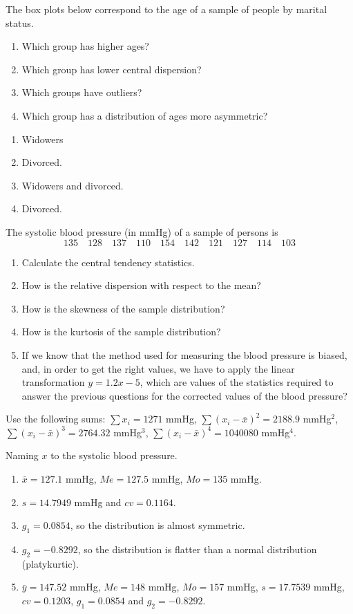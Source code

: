 {The box plots below correspond to the age of a sample of people by marital status.
\begin{center}
\resizebox{0.6\textwidth}{!}{}
\end{center}

\begin{enumerate}
\item Which group has higher ages?
\item Which group has lower central dispersion?
\item Which groups have outliers?
\item Which group has a distribution of ages more asymmetric?
\end{enumerate}
}
{
\begin{enumerate}
\item Widowers
\item Divorced.
\item Widowers and divorced.
\item Divorced.
\end{enumerate}
}
{
}


{The systolic blood pressure (in mmHg) of a sample of persons is
\[
135\quad 128\quad 137\quad 110\quad 154\quad 142\quad 121\quad 127\quad 114\quad 103
\]

\begin{enumerate}
\item Calculate the central tendency statistics.
\item How is the relative dispersion with respect to the mean?
\item How is the skewness of the sample distribution?
\item How is the kurtosis of the sample distribution?
\item If we know that the method used for measuring the blood pressure is biased, and, in order to get the right values,
we have to apply the linear transformation $y=1.2x-5$, which are values of the statistics required to answer the
previous questions for the corrected values of the blood pressure?
\end{enumerate}


Use the following sums: $\sum x_i= 1271$ mmHg, $\sum (x_i-\bar x)^2=2188.9$ mmHg$^2$, $\sum (x_i-\bar x)^3=2764.32$
mmHg$^3$, $\sum (x_i-\bar x)^4=1040080$ mmHg$^4$.
}
{
Naming $x$ to the systolic blood pressure.
\begin{enumerate}
\item $\bar{x}=127.1$ mmHg, $Me=127.5$ mmHg, $Mo=135$ mmHg.
\item $s=14.7949$ mmHg and $cv=0.1164$.
\item $g_1=0.0854$, so the distribution is almost symmetric.
\item $g_2=-0.8292$, so the distribution is flatter than a normal distribution (platykurtic).
\item $\bar{y}=147.52$ mmHg, $Me=148$ mmHg, $Mo=157$ mmHg, $s=17.7539$ mmHg, $cv=0.1203$, $g_1=0.0854$ and $g_2=-0.8292$.
\end{enumerate}
}
{
}

